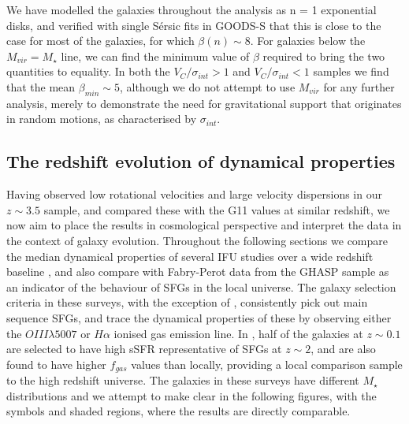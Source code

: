 \documentclass[fleqn,usenatbib]{mn2e}
\newcommand{\Sers}{S\'{e}rsic }
\begin{document}

We have modelled the galaxies throughout the analysis as n = 1 exponential disks, and verified with single \Sers fits in GOODS-S that this is close to the case for most of the galaxies, for which $\beta(n) \sim 8$.
For galaxies below the $M_{vir} = M_{\star}$ line, we can find the minimum value of $\beta$ required to bring the two quantities to equality.
In both the $V_{C}/\sigma_{int} > 1$ and $V_{C}/\sigma_{int} < 1$ samples we find that the mean $\beta_{min}\sim 5$, although we do not attempt to use $M_{vir}$ for any further analysis, merely to demonstrate the need for gravitational support that originates in random motions, as characterised by $\sigma_{int}$.
 
\subsection{The redshift evolution of dynamical properties}\label{subsec:redshift_evolution}
Having observed low rotational velocities and large velocity dispersions in our $z \sim 3.5$ sample, and compared these with the G11 values at similar redshift, we now aim to place the results in cosmological perspective and interpret the data in the context of galaxy evolution.
Throughout the following sections we compare the median dynamical properties of several IFU studies over a wide redshift baseline \citep{Green2014,Wisnioski2015,Epinat2012,ForsterSchreiber2009,Cresci2009,Gnerucci2011}, and also compare with Fabry-Perot data from the GHASP sample \citep{Epinat2008,Epinat2008a} as an indicator of the behaviour of SFGs in the local universe.
The galaxy selection criteria in these surveys, with the exception of \cite{Green2014}, consistently pick out main sequence SFGs, and trace the dynamical properties of these by observing either the $OIII\lambda5007$ or $H\alpha$ ionised gas emission line.
In \cite{Green2014}, half of the galaxies at $z\sim 0.1$ are selected to have high sSFR representative of SFGs at $z\sim 2$, and are also found to have higher $f_{gas}$ values than locally, providing a local comparison sample to the high redshift universe. 
The galaxies in these surveys have different $M_{\star}$ distributions and we attempt to make clear in the following figures, with the symbols and shaded regions, where the results are directly comparable. 
\end{document}
